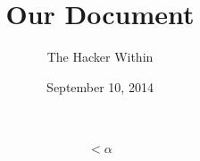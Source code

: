 \documentclass[11pt]{article}
\author{The Hacker Within}
\title{Our Document}
\date{September 10, 2014}
\begin{document}
\maketitle

\begin{equation}
< \alpha
\end{equation}
\end{document}
